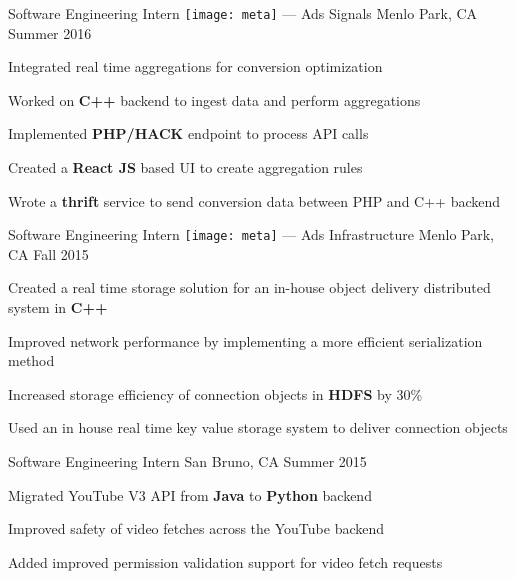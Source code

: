 \begin{cventries}

\cventry
{Software Engineering Intern} %
{{\texttt{[image: meta]}} --- Ads Signals} %
{Menlo Park, CA} %
{Summer 2016} %
{ %
\begin{cvitems}
\item {Integrated real time aggregations for conversion optimization}
\item {Worked on \textbf{C++} backend to ingest data and perform aggregations}
\item {Implemented \textbf{PHP/HACK} endpoint to process API calls}
\item {Created a \textbf{React JS} based UI to create aggregation rules}
\item {Wrote a \textbf{thrift} service to send conversion data between PHP and C++ backend}
\end{cvitems}
}


\cventry
{Software Engineering Intern} %
{{\texttt{[image: meta]}} --- Ads Infrastructure} %
{Menlo Park, CA} %
{Fall 2015} %
{ %
\begin{cvitems}
\item {Created a real time storage solution for an in-house object delivery distributed system in \textbf{C++}}
\item {Improved network performance by implementing a more efficient serialization method}
\item {Increased storage efficiency of connection objects in \textbf{HDFS} by 30\%}
\item {Used an in house real time key value storage system to deliver connection objects}
\end{cvitems}
}


\cventry
{Software Engineering Intern} %
{\google}%
{San Bruno, CA} %
{Summer 2015} %
{ %
\begin{cvitems}
\item {Migrated YouTube V3 API from \textbf{Java} to \textbf{Python} backend}
\item {Improved safety of video fetches across the YouTube backend}
\item {Added improved permission validation support for video fetch requests}
\end{cvitems} 
}


\end{cventries}
